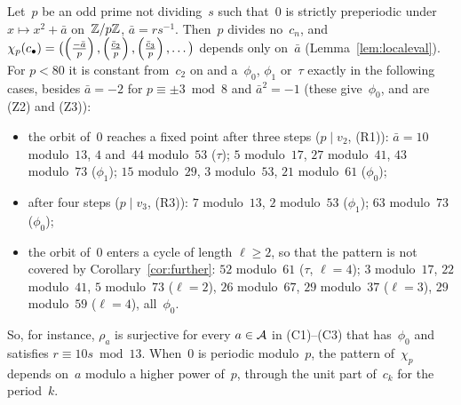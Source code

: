 \begin{remark}
  \label{rem:residues}
  Let~$p$ be an odd prime not dividing~$s$ such that~$0$ is strictly preperiodic under
  $x \mapsto x^2 + \bar a$ on~$\mathbb{Z}/p\mathbb{Z}$, $\bar a = r s^{-1}$. Then~$p$ divides no~$c_n$, and
  $\chi_p(c_\bullet) = \bigl(\left(\frac{-\bar a}{p}\right), \left(\frac{\bar c_2}{p}\right), \left(\frac{\bar c_3}{p}\right), \dots\bigr)$
  depends only on~$\bar a$ (Lemma~\ref{lem:localeval}). For $p < 80$ it is constant from~$c_2$ on
  and a~$\phi_0$, $\phi_1$ or~$\tau$ exactly in the following cases, besides $\bar a = -2$ for
  $p \equiv \pm 3 \bmod 8$ and $\bar a^2 = -1$ (these give~$\phi_0$, and are (Z2) and (Z3)):
  \begin{itemize}
    \item the orbit of~$0$ reaches a fixed point after three steps ($p \mid v_2$, (R1)):
          $\bar a = 10$ modulo~$13$, $4$ and~$44$ modulo~$53$ ($\tau$); $5$ modulo~$17$, $27$
          modulo~$41$, $43$ modulo~$73$ ($\phi_1$); $15$ modulo~$29$, $3$ modulo~$53$, $21$
          modulo~$61$ ($\phi_0$);
    \item after four steps ($p \mid v_3$, (R3)): $7$ modulo~$13$, $2$ modulo~$53$ ($\phi_1$); $63$
          modulo~$73$ ($\phi_0$);
    \item the orbit of~$0$ enters a cycle of length $\ell \ge 2$, so that the pattern is not
          covered by Corollary~\ref{cor:further}: $52$ modulo~$61$ ($\tau$, $\ell = 4$); $3$
          modulo~$17$, $22$ modulo~$41$, $5$ modulo~$73$ ($\ell = 2$), $26$ modulo~$67$, $29$
          modulo~$37$ ($\ell = 3$), $29$ modulo~$59$ ($\ell = 4$), all~$\phi_0$.
  \end{itemize}
  So, for instance, $\rho_a$ is surjective for every $a \in \mathcal{A}$ in (C1)--(C3) that has~$\phi_0$
  and satisfies $r \equiv 10 s \bmod 13$. When~$0$ is periodic modulo~$p$, the pattern
  of~$\chi_p$ depends on~$a$ modulo a higher power of~$p$, through the unit part of~$c_k$ for the
  period~$k$.
\end{remark}


